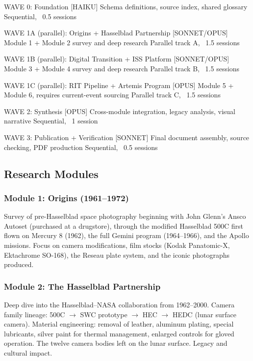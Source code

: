 \documentclass[11pt,letterpaper]{article}
\begin{document}
\begin{asciibox}
WAVE 0: Foundation
  [HAIKU] Schema definitions, source index, shared glossary
  Sequential, ~0.5 sessions

WAVE 1A (parallel): Origins + Hasselblad Partnership
  [SONNET/OPUS] Module 1 + Module 2 survey and deep research
  Parallel track A, ~1.5 sessions

WAVE 1B (parallel): Digital Transition + ISS Platform
  [SONNET/OPUS] Module 3 + Module 4 survey and deep research
  Parallel track B, ~1.5 sessions

WAVE 1C (parallel): RIT Pipeline + Artemis Program
  [OPUS] Module 5 + Module 6, requires current-event sourcing
  Parallel track C, ~1.5 sessions

WAVE 2: Synthesis
  [OPUS] Cross-module integration, legacy analysis, visual narrative
  Sequential, ~1 session

WAVE 3: Publication + Verification
  [SONNET] Final document assembly, source checking, PDF production
  Sequential, ~0.5 sessions
\end{asciibox}

\subsection{Research Modules}

\subsubsection{Module 1: Origins (1961--1972)}
Survey of pre-Hasselblad space photography beginning with John Glenn's Ansco Autoset (purchased at a drugstore), through the modified Hasselblad 500C first flown on Mercury 8 (1962), the full Gemini program (1964--1966), and the Apollo missions. Focus on camera modifications, film stocks (Kodak Panatomic-X, Ektachrome SO-168), the Reseau plate system, and the iconic photographs produced.

\subsubsection{Module 2: The Hasselblad Partnership}
Deep dive into the Hasselblad--NASA collaboration from 1962--2000. Camera family lineage: 500C $\to$ SWC prototype $\to$ HEC $\to$ HEDC (lunar surface camera). Material engineering: removal of leather, aluminum plating, special lubricants, silver paint for thermal management, enlarged controls for gloved operation. The twelve camera bodies left on the lunar surface. Legacy and cultural impact.
\end{document}
